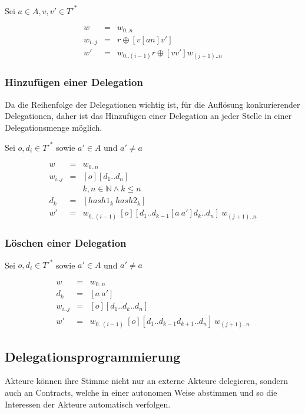\documentclass[]{article}
\begin{document}
Sei $a\in A, v,v'\in T'^*$

\begin{eqnarray}
  w &=& w_{0..n} \\
  w_{i..j}&=& r\oplus [v [an] v'] \\
  w' &=& w_{0..(i-1)} r\oplus [vv'] w_{(j+1)..n}
\end{eqnarray}


\subsubsection*{Hinzufügen einer Delegation}
Da die Reihenfolge der Delegationen wichtig ist, für die Auflösung konkurierender Delegationen, daher ist das Hinzufügen einer Delegation an jeder Stelle in einer Delegationsmenge möglich.

Sei $o,d_i \in T'^*$ sowie $a'\in A$ und $a'\neq a$

\begin{eqnarray}
  w &=& w_{0..n} \\
  w_{i..j} &=& [o][d_1 .. d_n] \\
  &&k,n\in \mathbb{N} \land k\leq n \\
  d_k &=& [hash1_k\ hash2_k] \\ 
  w' &=& w_{0 .. (i-1)}\ [o][d_1 .. d_{k-1} [a\ a'] d_k .. d_n ]\ w_{(j+1) .. n}
\end{eqnarray}

\subsubsection*{Löschen einer Delegation}

Sei $o,d_i \in T'^*$ sowie $a'\in A$ und $a'\neq a$

\begin{eqnarray}
  w &=& w_{0..n} \\
  d_k &=& [a\ a'] \\
  w_{i..j} &=& [o][d_1 .. d_{k} .. d_n ] \\
  w' &=& w_{0 .. (i-1)}\ [o][d_1 .. d_{k-1} d_{k+1} .. d_n ]\ w_{(j+1) .. n}
\end{eqnarray}

\subsection{Delegationsprogrammierung}
Akteure können ihre Stimme nicht nur an externe Akteure delegieren, sondern auch an Contracts, welche in einer autonomen Weise abstimmen und so die Interessen der Akteure automatisch verfolgen. 
\end{document}
